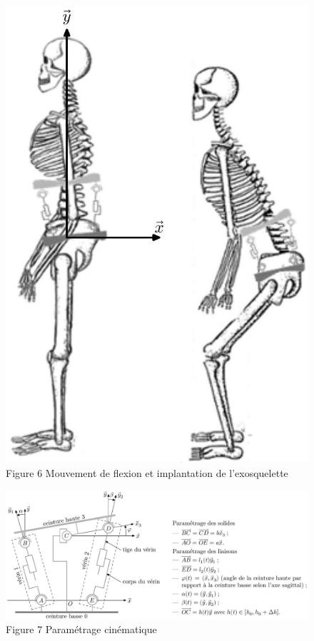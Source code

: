 \documentclass[10pt]{article}
\begin{document}
\begin{figure}[h]
\begin{center}
  \includegraphics[width=\textwidth]{2025_09_16_5f2d7643f7e649c6833dg-05}
\captionsetup{labelformat=empty}
\caption{Figure 6 Mouvement de flexion et implantation de l'exosquelette}
\end{center}
\end{figure}

\begin{figure}[h]
\begin{center}
  \includegraphics[width=\textwidth]{2025_09_16_5f2d7643f7e649c6833dg-05(1)}
\captionsetup{labelformat=empty}
\caption{Figure 7 Paramétrage cinématique}
\end{center}
\end{figure}
\end{document}
